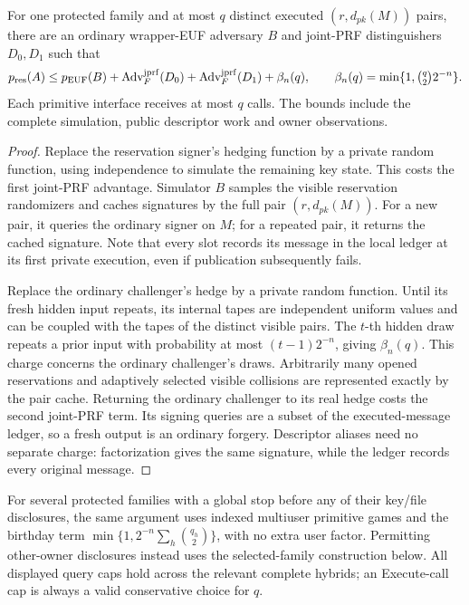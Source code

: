 \begin{proposition}
\label{prop:independent-hedging-bridge}
For one protected family and at most $q$ distinct executed
$(r,d_{pk}(M))$ pairs, there are an ordinary wrapper-EUF adversary $B$ and
joint-PRF distinguishers $D_0,D_1$ such that
\begin{equation}
 p_{\rm res}(A)\le p_{\rm EUF}(B)
   +\operatorname{Adv}^{\rm jprf}_F(D_0)
   +\operatorname{Adv}^{\rm jprf}_F(D_1)
   +\beta_n(q),\qquad
 \beta_n(q)=\min\{1,\tbinom q2 2^{-n}\}.
 \label{eq:independent-hedging-bridge}
\end{equation}
Each primitive interface receives at most $q$ calls. The bounds include
the complete simulation, public descriptor work and owner observations.
\end{proposition}
\begin{proof}
Replace the reservation signer's hedging function by a private random
function, using independence to simulate the remaining key state. This
costs the first joint-PRF advantage. Simulator $B$ samples the visible
reservation randomizers and caches signatures by the full pair
$(r,d_{pk}(M))$. For a new pair, it queries the ordinary signer on
$M$; for a repeated pair, it returns the cached signature. Note that
every slot records its message in the local ledger at its first private
execution, even if publication subsequently fails.

Replace the ordinary challenger's hedge by a private random function.
Until its fresh hidden input repeats, its internal tapes are independent
uniform values and can be coupled with the tapes of the distinct visible
pairs. The $t$-th hidden draw repeats a prior input with probability at
most $(t-1)2^{-n}$, giving $\beta_n(q)$. This charge concerns the ordinary
challenger's draws. Arbitrarily many opened reservations and adaptively
selected visible collisions are represented exactly by the pair cache.
Returning the ordinary challenger to its real hedge costs the second
joint-PRF term. Its signing queries are a subset of the executed-message
ledger, so a fresh output is an ordinary forgery. Descriptor aliases need
no separate charge: factorization gives the same signature, while the
ledger records every original message.
\end{proof}

For several protected families with a global stop before any of their
key/file disclosures, the same argument uses indexed multiuser primitive
games and the birthday term
$\min\{1,2^{-n}\sum_h\binom{q_h}{2}\}$, with no extra user factor.
Permitting other-owner disclosures instead uses the selected-family
construction below. All displayed query caps hold across the relevant
complete hybrids; an Execute-call cap is always a valid conservative
choice for $q$.

